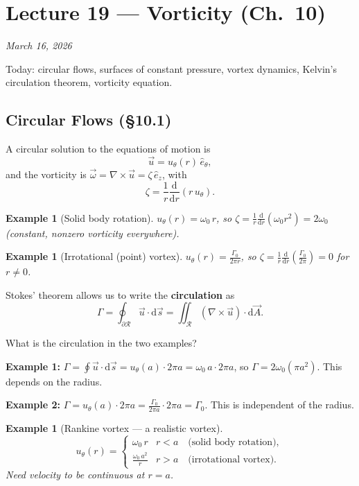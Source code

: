 \documentclass[11pt,a4paper]{article}
\newtheorem{example}[theorem]{Example}
\newcommand{\uv}{\vec{u}}
\newcommand{\omv}{\vec{\omega}}
\begin{document}
\section{Lecture 19 --- Vorticity (Ch.\ 10)}
\textit{March 16, 2026}

Today: circular flows, surfaces of constant pressure, vortex dynamics, Kelvin's circulation theorem, vorticity equation.

\subsection{Circular Flows (\S10.1)}

A circular solution to the equations of motion is
\[
    \uv = u_\theta(r)\,\hat{e}_\theta,
\]
and the vorticity is $\omv = \nabla\times\uv = \zeta\,\hat{e}_z$, with
\[
    \zeta = \frac{1}{r}\frac{\mathrm{d}}{\mathrm{d}r}(r\,u_\theta).
\]

\begin{example}[Solid body rotation]
$u_\theta(r) = \omega_0\,r$, so $\zeta = \frac{1}{r}\frac{\mathrm{d}}{\mathrm{d}r}(\omega_0 r^2) = 2\omega_0$ (constant, nonzero vorticity everywhere).
\end{example}

\begin{example}[Irrotational (point) vortex]
$u_\theta(r) = \frac{\Gamma_0}{2\pi r}$, so $\zeta = \frac{1}{r}\frac{\mathrm{d}}{\mathrm{d}r}\!\left(\frac{\Gamma_0}{2\pi}\right) = 0$ for $r \neq 0$.
\end{example}

Stokes' theorem allows us to write the \textbf{circulation} as
\[
    \boxed{\Gamma = \oint_{\partial\mathcal{R}} \uv\cdot\mathrm{d}\vec{s} = \iint_{\mathcal{R}} (\nabla\times\uv)\cdot\mathrm{d}\vec{A}.}
\]

What is the circulation in the two examples?

\textbf{Example 1:} $\Gamma = \oint \uv\cdot\mathrm{d}\vec{s} = u_\theta(a)\cdot 2\pi a = \omega_0\,a \cdot 2\pi a$, so $\Gamma = 2\omega_0(\pi a^2)$. This depends on the radius.

\textbf{Example 2:} $\Gamma = u_\theta(a)\cdot 2\pi a = \frac{\Gamma_0}{2\pi a}\cdot 2\pi a = \Gamma_0$. This is independent of the radius.

\begin{example}[Rankine vortex --- a realistic vortex]
\[
    u_\theta(r) = \begin{cases} \omega_0\,r & r < a \quad \text{(solid body rotation)},\\ \frac{\omega_0\,a^2}{r} & r > a \quad \text{(irrotational vortex)}.\end{cases}
\]
Need velocity to be continuous at $r = a$.
\end{example}
\end{document}
